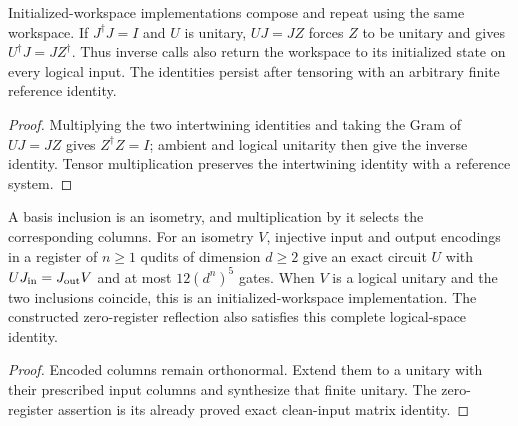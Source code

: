 \begin{lemma}
    \label{thm:mpu_clean_unitary_composition}
    \leanok
    Initialized-workspace implementations compose and repeat using
    the same workspace. If $J^\dagger J=I$ and $U$ is unitary,
    $UJ=JZ$ forces $Z$ to be unitary and gives
    $U^\dagger J=JZ^\dagger$. Thus inverse calls also return the
    workspace to its initialized state on every logical input.
    The identities persist after tensoring with an arbitrary
    finite reference identity.
\end{lemma}
\begin{proof}\leanok
    Multiplying the two intertwining identities and taking the Gram
    of $UJ=JZ$ gives $Z^\dagger Z=I$; ambient and logical unitarity
    then give the inverse identity. Tensor multiplication preserves
    the intertwining identity with a reference system.
\end{proof}

\begin{lemma}
    \label{thm:mpu_initialized_isometry_synthesis}
    \leanok
    A basis inclusion is an isometry, and multiplication by it selects
    the corresponding columns. For an isometry $V$, injective input
    and output encodings in a register of $n\geq1$ qudits of
    dimension $d\geq2$ give an exact
    circuit $U$ with $UJ_{\rm in}=J_{\rm out}V$ and at most
    $12(d^n)^5$ gates. When $V$ is a logical unitary and the two
    inclusions coincide, this is an initialized-workspace implementation.
    The constructed zero-register reflection also satisfies this
    complete logical-space identity.
\end{lemma}
\begin{proof}\leanok
    Encoded columns remain orthonormal. Extend them to a unitary
    with their prescribed input columns and synthesize that finite
    unitary. The zero-register assertion is its already proved
    exact clean-input matrix identity.
\end{proof}

